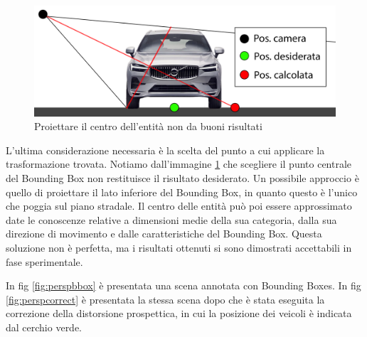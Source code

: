 \begin{figure}
    \centering
    \includegraphics[width=\textwidth]{images/proiez_pos.png}
    \caption{Proiettare il centro dell'entità non da buoni risultati}
    \label{fig:proiezcenter}
\end{figure}

L'ultima considerazione necessaria è la scelta del punto a cui applicare la trasformazione trovata.
Notiamo dall'immagine \ref{fig:proiezcenter} che scegliere il punto centrale del Bounding Box non restituisce il risultato desiderato.
Un possibile approccio è quello di proiettare il lato inferiore del Bounding Box, in quanto questo è l'unico che poggia sul piano stradale.
Il centro delle entità può poi essere approssimato date le conoscenze relative a dimensioni medie della sua categoria, dalla sua direzione di movimento e dalle caratteristiche del Bounding Box.
Questa soluzione non è perfetta, ma i risultati ottenuti si sono dimostrati accettabili in fase sperimentale.

In fig \ref{fig:perspbbox} è presentata una scena annotata con Bounding Boxes.
In fig \ref{fig:perspcorrect} è presentata la stessa scena dopo che è stata eseguita la correzione della distorsione prospettica, in cui la posizione dei veicoli è indicata dal cerchio verde.

